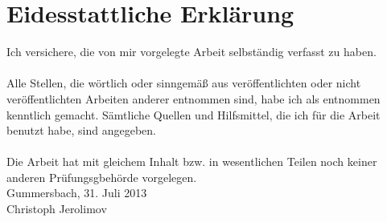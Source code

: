 
\chapter*{Eidesstattliche Erklärung}
Ich versichere, die von mir vorgelegte Arbeit selbständig verfasst zu haben.\\ \\
Alle Stellen, die wörtlich oder sinngemäß aus veröffentlichten oder nicht veröffentlichten Arbeiten anderer entnommen sind, habe ich als entnommen kenntlich gemacht. Sämtliche Quellen und Hilfsmittel, die ich für die Arbeit benutzt habe, sind angegeben.\\ \\
Die Arbeit hat mit gleichem Inhalt bzw. in wesentlichen Teilen noch keiner anderen Prüfungsgbehörde vorgelegen.
\vspace{1.5cm}
\\
Gummersbach, 31. Juli 2013
\vspace{3cm}
\\
Christoph Jerolimov

